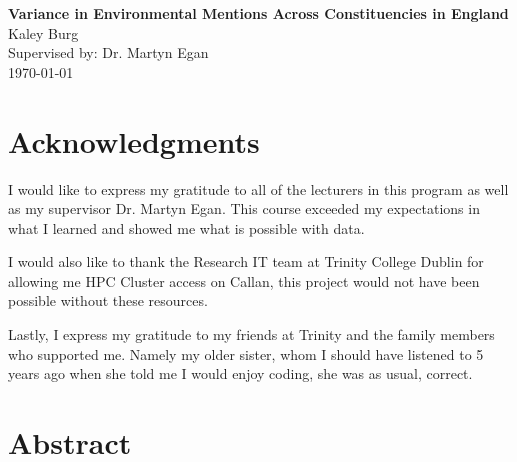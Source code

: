 \documentclass[12pt,letterpaper]{article}
\begin{document}
	
	\begin{titlepage}
		\thispagestyle{titlepageheader} %
		
		\vspace*{5cm} %
		\begin{center}
			\Large{\textbf{Variance in Environmental Mentions Across Constituencies in England}} \\ %
			\vspace{1.5cm}
			\Large{Kaley Burg} \\ %
			\vspace{0.5cm}
			\large{Supervised by: Dr. Martyn Egan} \\ %
			\vspace{1.5cm}
			\large{\today} %
		\end{center}
	\end{titlepage}
			
			\tableofcontents
			

			
			\newpage
			
\section*{Acknowledgments}

\noindent			
I would like to express my gratitude to all of the lecturers in this program as well as my supervisor Dr. Martyn Egan. This course exceeded my expectations in what I learned and showed me what is possible with data.
			\vspace{0.5cm}

\noindent		
I would also like to thank the Research IT team at Trinity College Dublin for allowing me HPC Cluster access on Callan, this project would not have been possible without these resources.

			\vspace{0.5cm}
\noindent
Lastly, I express my gratitude to my friends at Trinity and the family members who supported me. Namely my older sister, whom I should have listened to 5 years ago when she told me I would enjoy coding, she was as usual, correct.
			
			\newpage
	
	\section{Abstract}
	
\end{document}
